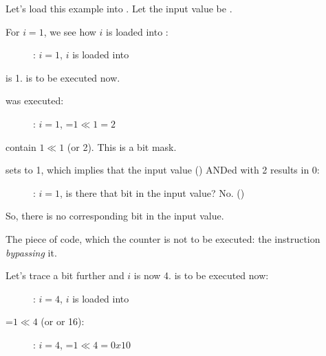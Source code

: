 ﻿\clearpage
\mysubparagraph{\olly}
\myindex{\olly}

Let's load this example into \olly. 
Let the input value be .

For $i=1$, we see how $i$ is loaded into \ECX: 

\begin{figure}[H]
\centering
{}
\caption{\olly: $i=1$, $i$ is loaded into \ECX}
\label{fig:shifts_olly1_1}
\end{figure}

\EDX is 1. \SHL is to be executed now.

\clearpage
\SHL was executed:

\begin{figure}[H]
\centering
{}
\caption{\olly: $i=1$, \EDX=$1 \ll 1=2$}
\label{fig:shifts_olly1_2}
\end{figure}

\EDX contain $1 \ll 1$ (or 2). This is a bit mask.

\clearpage
\AND sets \ZF to 1, which implies that the input value ()  ANDed with 2 results in 0:

\begin{figure}[H]
\centering
{}
\caption{\olly: $i=1$, 
is there that bit in the input value? No. ()}
\label{fig:shifts_olly1_3}
\end{figure}

So, there is no corresponding bit in the input value.

The piece of code, which  the counter is not to be executed: 
the \JZ instruction \emph{bypassing} it.

\clearpage
Let's trace a bit further and $i$ is now 4.
\SHL is to be executed now:

\begin{figure}[H]
\centering
{}
\caption{\olly: $i=4$, $i$ is loaded into \ECX}
\label{fig:shifts_olly4_1}
\end{figure}

\clearpage
\EDX=$1 \ll 4$ (or  or 16): 

\begin{figure}[H]
\centering
{}
\caption{\olly: $i=4$, \EDX=$1 \ll 4=0x10$}
\label{fig:shifts_olly4_2}
\end{figure}

